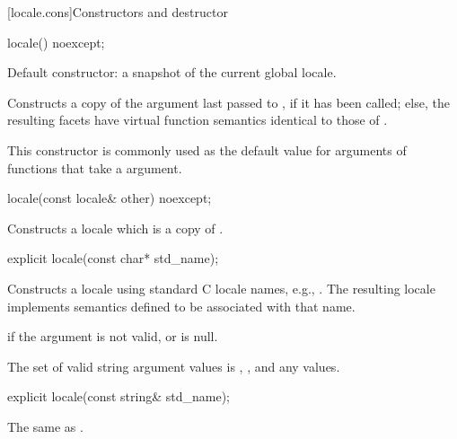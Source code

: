 [locale.cons]{Constructors and destructor}

%
\begin{itemdecl}
locale() noexcept;
\end{itemdecl}

\begin{itemdescr}
\pnum
Default constructor: a snapshot of the current global locale.

\pnum
\effects
Constructs a copy of the argument last passed to
,
if it has been called; else, the resulting facets have virtual
function semantics identical to those of
.
\begin{note}
This constructor is commonly used as the default value for arguments
of functions that take a
argument.
\end{note}
\end{itemdescr}

%
\begin{itemdecl}
locale(const locale& other) noexcept;
\end{itemdecl}

\begin{itemdescr}
\pnum
\effects
Constructs a locale which is a copy of .
\end{itemdescr}

%
\begin{itemdecl}
explicit locale(const char* std_name);
\end{itemdecl}

\begin{itemdescr}
\pnum
\effects
Constructs a locale using standard C locale names, e.g., .
The resulting locale implements semantics defined to be associated
with that name.

\pnum
\throws
{}
if the argument is not valid, or is null.

\pnum
\remarks
The set of valid string argument values is , ,
and any  values.
\end{itemdescr}

%
\begin{itemdecl}
explicit locale(const string& std_name);
\end{itemdecl}

\begin{itemdescr}
\pnum
\effects The same as .
\end{itemdescr}

